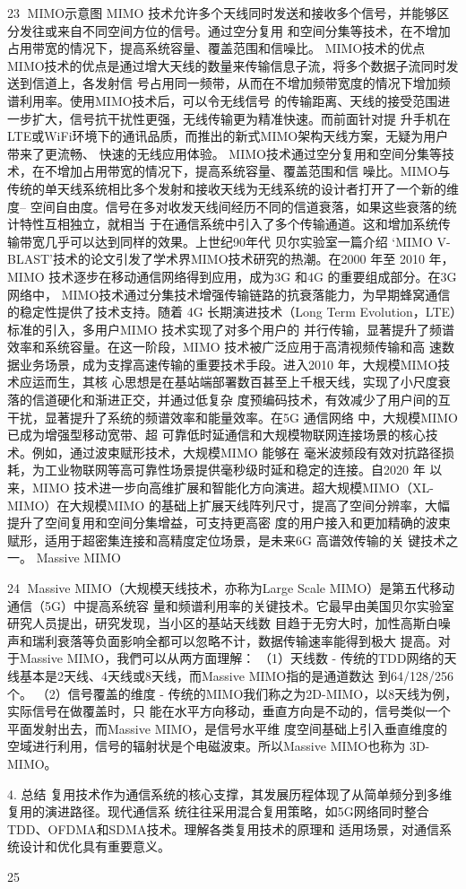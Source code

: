                                                    23
MIMO示意图
MIMO 技术允许多个天线同时发送和接收多个信号，并能够区分发往或来自不同空间方位的信号。通过空分复用
和空间分集等技术，在不增加占用带宽的情况下，提高系统容量、覆盖范围和信噪比。
MIMO技术的优点
MIMO技术的优点是通过增大天线的数量来传输信息子流，将多个数据子流同时发送到信道上，各发射信
号占用同一频带，从而在不增加频带宽度的情况下增加频谱利用率。使用MIMO技术后，可以令无线信号
的传输距离、天线的接受范围进一步扩大，信号抗干扰性更强，无线传输更为精准快速。而前面针对提
升手机在LTE或WiFi环境下的通讯品质，而推出的新式MIMO架构天线方案，无疑为用户带来了更流畅、
快速的无线应用体验。
MIMO技术通过空分复用和空间分集等技术，在不增加占用带宽的情况下，提高系统容量、覆盖范围和信
噪比。MIMO与传统的单天线系统相比多个发射和接收天线为无线系统的设计者打开了一个新的维度--
空间自由度。信号在多对收发天线间经历不同的信道衰落，如果这些衰落的统计特性互相独立，就相当
于在通信系统中引入了多个传输通道。这和增加系统传输带宽几乎可以达到同样的效果。上世纪90年代
贝尔实验室一篇介绍 ‘MIMO V-BLAST’技术的论文引发了学术界MIMO技术研究的热潮。在2000 年至
2010 年，MIMO 技术逐步在移动通信网络得到应用，成为3G 和4G 的重要组成部分。在3G 网络中，
MIMO技术通过分集技术增强传输链路的抗衰落能力，为早期蜂窝通信的稳定性提供了技术支持。随着
4G 长期演进技术（Long Term Evolution，LTE）标准的引入，多用户MIMO 技术实现了对多个用户的
并行传输，显著提升了频谱效率和系统容量。在这一阶段，MIMO 技术被广泛应用于高清视频传输和高
速数据业务场景，成为支撑高速传输的重要技术手段。进入2010 年，大规模MIMO技术应运而生，其核
心思想是在基站端部署数百甚至上千根天线，实现了小尺度衰落的信道硬化和渐进正交，并通过低复杂
度预编码技术，有效减少了用户间的互干扰，显著提升了系统的频谱效率和能量效率。在5G 通信网络
中，大规模MIMO 已成为增强型移动宽带、超
可靠低时延通信和大规模物联网连接场景的核心技术。例如，通过波束赋形技术，大规模MIMO 能够在
毫米波频段有效对抗路径损耗，为工业物联网等高可靠性场景提供毫秒级时延和稳定的连接。自2020 年
以来，MIMO 技术进一步向高维扩展和智能化方向演进。超大规模MIMO（XL-MIMO）在大规模MIMO
的基础上扩展天线阵列尺寸，提高了空间分辨率，大幅提升了空间复用和空间分集增益，可支持更高密
度的用户接入和更加精确的波束赋形，适用于超密集连接和高精度定位场景，是未来6G 高谱效传输的关
键技术之一。
Massive MIMO

                                                         24
Massive MIMO（大规模天线技术，亦称为Large Scale MIMO）是第五代移动通信（5G）中提高系统容
量和频谱利用率的关键技术。它最早由美国贝尔实验室研究人员提出，研究发现，当小区的基站天线数
目趋于无穷大时，加性高斯白噪声和瑞利衰落等负面影响全都可以忽略不计，数据传输速率能得到极大
提高。对于Massive MIMO，我們可以从两方面理解：
（1）天线数 - 传统的TDD网络的天线基本是2天线、4天线或8天线，而Massive MIMO指的是通道数达
到64/128/256个。
（2）信号覆盖的维度 - 传统的MIMO我们称之为2D-MIMO，以8天线为例，实际信号在做覆盖时，只
能在水平方向移动，垂直方向是不动的，信号类似一个平面发射出去，而Massive MIMO，是信号水平维
度空间基础上引入垂直维度的空域进行利用，信号的辐射状是个电磁波束。所以Massive MIMO也称为
3D-MIMO。

4. 总结
复用技术作为通信系统的核心支撑，其发展历程体现了从简单频分到多维复用的演进路径。现代通信系
统往往采用混合复用策略，如5G网络同时整合TDD、OFDMA和SDMA技术。理解各类复用技术的原理和
适用场景，对通信系统设计和优化具有重要意义。




                                                         25
